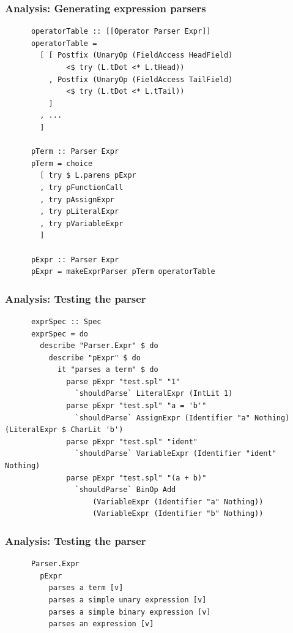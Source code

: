 \documentclass{beamer}
\begin{document}
\begin{frame}[fragile]
  \frametitle{Analysis: Generating expression parsers}

  \begin{center}
    \begin{verbatim}
      operatorTable :: [[Operator Parser Expr]]
      operatorTable =
        [ [ Postfix (UnaryOp (FieldAccess HeadField) 
              <$ try (L.tDot <* L.tHead))
          , Postfix (UnaryOp (FieldAccess TailField) 
              <$ try (L.tDot <* L.tTail))
          ]
        , ...
        ]

      pTerm :: Parser Expr
      pTerm = choice
        [ try $ L.parens pExpr
        , try pFunctionCall
        , try pAssignExpr
        , try pLiteralExpr
        , try pVariableExpr
        ]

      pExpr :: Parser Expr
      pExpr = makeExprParser pTerm operatorTable
    \end{verbatim}
  \end{center}
\end{frame}

\begin{frame}[fragile]
  \frametitle{Analysis: Testing the parser}

  \begin{center}
    \begin{verbatim}
      exprSpec :: Spec
      exprSpec = do
        describe "Parser.Expr" $ do
          describe "pExpr" $ do
            it "parses a term" $ do
              parse pExpr "test.spl" "1" 
                `shouldParse` LiteralExpr (IntLit 1)
              parse pExpr "test.spl" "a = 'b'" 
                `shouldParse` AssignExpr (Identifier "a" Nothing) (LiteralExpr $ CharLit 'b')
              parse pExpr "test.spl" "ident"
                `shouldParse` VariableExpr (Identifier "ident" Nothing)
              parse pExpr "test.spl" "(a + b)"
                `shouldParse` BinOp Add 
                    (VariableExpr (Identifier "a" Nothing))
                    (VariableExpr (Identifier "b" Nothing))
    \end{verbatim}
  \end{center}

  
\end{frame}

\begin{frame}[fragile]
  \frametitle{Analysis: Testing the parser}

  \begin{center}
    \begin{verbatim}
      Parser.Expr
        pExpr
          parses a term [v]
          parses a simple unary expression [v]
          parses a simple binary expression [v]
          parses an expression [v]
    \end{verbatim}
  \end{center}
\end{frame}
\end{document}
